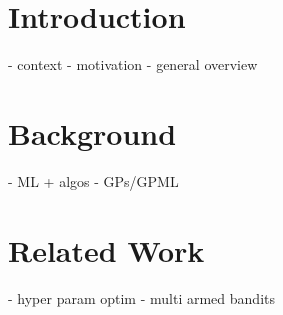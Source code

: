 \documentclass[a4paper,12pt,twoside,openright]{report}
\begin{document}
\pagestyle{empty}
\singlespacing

\onehalfspacing

\singlespacing


\setcounter{page}{0}
\pagestyle{plain}
\tableofcontents
\listoffigures
\listoftables

\onehalfspacing


\chapter{Introduction}
\setcounter{page}{1} 

- context
- motivation
- general overview





\chapter{Background} 
- ML + algos
- GPs/GPML




\chapter{Related Work} 

- hyper param optim
- multi armed bandits

\end{document}
